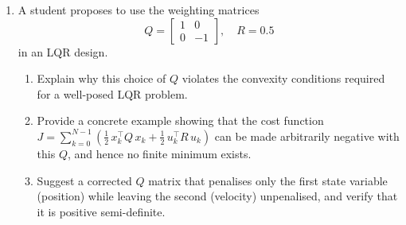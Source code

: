 \begin{enumerate}
	\item A student proposes to use the weighting matrices
	\[
	Q = \begin{bmatrix} 1 & 0 \\ 0 & -1 \end{bmatrix}, \quad R = 0.5
	\]
	in an LQR design.
	\begin{enumerate}
		\item Explain why this choice of $Q$ violates the convexity conditions required for a well-posed LQR problem.
		\item Provide a concrete example showing that the cost function $J = \sum_{k=0}^{N-1} \left(\frac{1}{2}\,x_k^\top Q\,x_k + \frac{1}{2}\,u_k^\top R\,u_k\right)$ can be made arbitrarily negative with this $Q$, and hence no finite minimum exists.
		\item Suggest a corrected $Q$ matrix that penalises only the first state variable (position) while leaving the second (velocity) unpenalised, and verify that it is positive semi-definite.
	\end{enumerate}
\end{enumerate}
